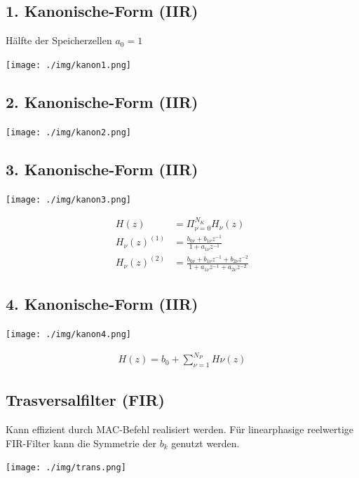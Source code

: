 \documentclass[10pt,a4paper]{article}
\begin{document}
\subsection{1. Kanonische-Form (IIR)}
Hälfte der Speicherzellen $a_0=1$
  \begin{center}
      \texttt{[image: ./img/kanon1.png]}
  \end{center}
\subsection{2. Kanonische-Form (IIR)}
  \begin{center}
      \texttt{[image: ./img/kanon2.png]}
  \end{center}
\subsection{3. Kanonische-Form (IIR)}
  \begin{center}
      \texttt{[image: ./img/kanon3.png]}
  \end{center}
  \begin{mdframed}[style=exercise]
    \begin{align}
        H(z)&=\Pi_{\nu=0}^{N_K} H_\nu(z)\\
        H_\nu(z)^{(1)}&=\frac{b_{0\nu}+b_{1\nu}z^{-1}}{1+a_{1\nu}z^{-1}}\\
        H_\nu(z)^{(2)}&=\frac{b_{0\nu}+b_{1\nu}z^{-1}+b_{2\nu}z^{-2}}{1+a_{1\nu}z^{-1}+a_{2\nu}z^{-2}}
    \end{align}
  \end{mdframed}
\subsection{4. Kanonische-Form (IIR)}
  \begin{center}
      \texttt{[image: ./img/kanon4.png]}
  \end{center}
  \begin{mdframed}[style=exercise]
    \begin{align}
        H(z)=b_0+\sum_{\nu=1}^{N_P}H\nu(z)
    \end{align}
  \end{mdframed}
\subsection{Trasversalfilter (FIR)}
Kann effizient durch MAC-Befehl realisiert werden. 
Für linearphasige reelwertige FIR-Filter kann die Symmetrie der $b_k$ genutzt werden.
  \begin{center}
      \texttt{[image: ./img/trans.png]}
  \end{center}
\end{document}

